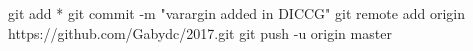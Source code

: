 git add *
git commit -m "varargin added in DICCG"
git remote add origin https://github.com/Gabydc/2017.git
git push -u origin master
